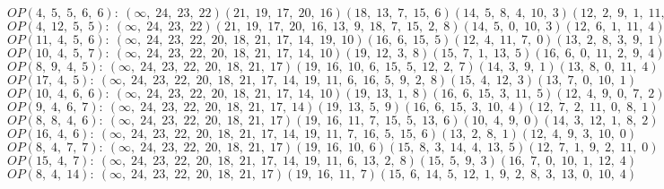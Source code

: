$OP(4, \;5, \;5, \;6, \;6): \:(\infty, \;24, \;23, \;22)(21, \;19, \;17, \;20, \;16)(18, \;13, \;7, \;15, \;6)(14, \;5, \;8, \;4, \;10, \;3)(12, \;2, \;9, \;1, \;11, \;0)$\\
$OP(4, \;12, \;5, \;5): \:(\infty, \;24, \;23, \;22)(21, \;19, \;17, \;20, \;16, \;13, \;9, \;18, \;7, \;15, \;2, \;8)(14, \;5, \;0, \;10, \;3)(12, \;6, \;1, \;11, \;4)$\\
$OP(11, \;4, \;5, \;6): \:(\infty, \;24, \;23, \;22, \;20, \;18, \;21, \;17, \;14, \;19, \;10)(16, \;6, \;15, \;5)(12, \;4, \;11, \;7, \;0)(13, \;2, \;8, \;3, \;9, \;1)$\\
$OP(10, \;4, \;5, \;7): \:(\infty, \;24, \;23, \;22, \;20, \;18, \;21, \;17, \;14, \;10)(19, \;12, \;3, \;8)(15, \;7, \;1, \;13, \;5)(16, \;6, \;0, \;11, \;2, \;9, \;4)$\\
$OP(8, \;9, \;4, \;5): \:(\infty, \;24, \;23, \;22, \;20, \;18, \;21, \;17)(19, \;16, \;10, \;6, \;15, \;5, \;12, \;2, \;7)(14, \;3, \;9, \;1)(13, \;8, \;0, \;11, \;4)$\\
$OP(17, \;4, \;5): \:(\infty, \;24, \;23, \;22, \;20, \;18, \;21, \;17, \;14, \;19, \;11, \;6, \;16, \;5, \;9, \;2, \;8)(15, \;4, \;12, \;3)(13, \;7, \;0, \;10, \;1)$\\
$OP(10, \;4, \;6, \;6): \:(\infty, \;24, \;23, \;22, \;20, \;18, \;21, \;17, \;14, \;10)(19, \;13, \;1, \;8)(16, \;6, \;15, \;3, \;11, \;5)(12, \;4, \;9, \;0, \;7, \;2)$\\
$OP(9, \;4, \;6, \;7): \:(\infty, \;24, \;23, \;22, \;20, \;18, \;21, \;17, \;14)(19, \;13, \;5, \;9)(16, \;6, \;15, \;3, \;10, \;4)(12, \;7, \;2, \;11, \;0, \;8, \;1)$\\
$OP(8, \;8, \;4, \;6): \:(\infty, \;24, \;23, \;22, \;20, \;18, \;21, \;17)(19, \;16, \;11, \;7, \;15, \;5, \;13, \;6)(10, \;4, \;9, \;0)(14, \;3, \;12, \;1, \;8, \;2)$\\
$OP(16, \;4, \;6): \:(\infty, \;24, \;23, \;22, \;20, \;18, \;21, \;17, \;14, \;19, \;11, \;7, \;16, \;5, \;15, \;6)(13, \;2, \;8, \;1)(12, \;4, \;9, \;3, \;10, \;0)$\\
$OP(8, \;4, \;7, \;7): \:(\infty, \;24, \;23, \;22, \;20, \;18, \;21, \;17)(19, \;16, \;10, \;6)(15, \;8, \;3, \;14, \;4, \;13, \;5)(12, \;7, \;1, \;9, \;2, \;11, \;0)$\\
$OP(15, \;4, \;7): \:(\infty, \;24, \;23, \;22, \;20, \;18, \;21, \;17, \;14, \;19, \;11, \;6, \;13, \;2, \;8)(15, \;5, \;9, \;3)(16, \;7, \;0, \;10, \;1, \;12, \;4)$\\
$OP(8, \;4, \;14): \:(\infty, \;24, \;23, \;22, \;20, \;18, \;21, \;17)(19, \;16, \;11, \;7)(15, \;6, \;14, \;5, \;12, \;1, \;9, \;2, \;8, \;3, \;13, \;0, \;10, \;4)$\\
